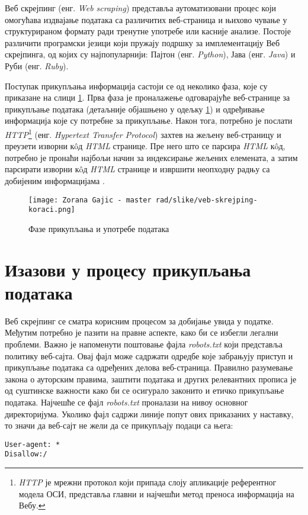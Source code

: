 \documentclass[12pt,oneside]{memoir}
\begin{document}
Веб скрејпинг (енг. \textit{Web scraping}) представља аутоматизовани процес који омогућава издвајање података са различитих веб-страница и њихово чување у структурираном формату ради тренутне употребе или касније анализе. Постоје различити програмски језици који пружају подршку за имплементацију Веб скрејпинга, од којих су најпопуларнији: Пајтон (енг. \textit{Python}), Јава (енг. \textit{Java}) и Руби (енг. \textit{Ruby}).

Поступак прикупљања информација састоји се од неколико фаза, које су приказане на слици  \ref{fig:web-scraping-steps}. Прва фаза је проналажење одговарајуће веб-странице за прикупљање података (детаљније објашњено у одељку \ref{chp:izazovi}) и одређивање информација које су потребне за прикупљање. Након тога, потребно је послати \textit{HTTP}\footnote{\textit{HTTP} је мрежни протокол који припада слоју апликације референтног модела ОСИ, представља главни и најчешћи метод преноса информација на Вебу.} (енг. \textit{Hypertext Transfer Protocol}) захтев на жељену веб-страницу и преузети изворни кôд \textit{HTML} странице. Пре него што се парсира \textit{HTML} кôд, потребно је пронаћи најбољи начин за индексирање жељених елемената, а затим парсирати изворни кôд \textit{HTML} странице и извршити неопходну радњу са добијеним информацијама \cite{EvalTools}.

\begin{figure}[!ht]
  \centering
  \texttt{[image: Zorana Gajic - master rad/slike/veb-skrejping-koraci.png]}
  \caption{Фазе прикупљања и употребе података}
  \label{fig:web-scraping-steps}
\end{figure}

\section{Изазови у процесу прикупљања података}
\label{chp:izazovi}

Веб скрејпинг се сматра корисним процесом за добијање увида у податке. Међутим потребно је пазити на правне аспекте, како би се избегли легални проблеми. Важно је напоменути поштовање фајла \textit{robots.txt} који представља политику веб-сајта. Овај фајл може садржати одредбе које забрањују приступ и прикупљање података са одређених делова веб-страница. 
Правилно разумевање закона о ауторским правима, заштити података и других релевантних прописа је од суштинске важности како би се осигурало законито и етичко прикупљање података. Најчешће се фајл \textit{robots.txt} проналази на нивоу основног директоријума. Уколико фајл садржи линије попут ових приказаних у наставку, то значи да веб-сајт не жели да се прикупљају подаци са њега:
\begin{verbatim}
User-agent: *
Disallow:/ 
\end{verbatim}
\end{document}
